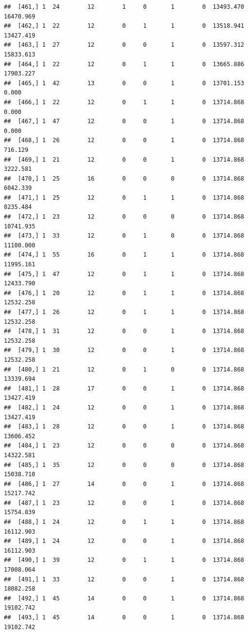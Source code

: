 \documentclass[
]{article}
\begin{document}
\begin{verbatim}
##  [461,] 1  24        12        1     0       1        0  13493.470  16470.969
##  [462,] 1  22        12        0     1       1        0  13518.941  13427.419
##  [463,] 1  27        12        0     0       1        0  13597.312  15833.613
##  [464,] 1  22        12        0     1       1        0  13665.886  17903.227
##  [465,] 1  42        13        0     0       1        0  13701.153      0.000
##  [466,] 1  22        12        0     1       1        0  13714.868      0.000
##  [467,] 1  47        12        0     0       1        0  13714.868      0.000
##  [468,] 1  26        12        0     0       1        0  13714.868    716.129
##  [469,] 1  21        12        0     0       1        0  13714.868   3222.581
##  [470,] 1  25        16        0     0       0        0  13714.868   6042.339
##  [471,] 1  25        12        0     1       1        0  13714.868   8235.484
##  [472,] 1  23        12        0     0       0        0  13714.868  10741.935
##  [473,] 1  33        12        0     1       0        0  13714.868  11100.000
##  [474,] 1  55        16        0     1       1        0  13714.868  11995.161
##  [475,] 1  47        12        0     1       1        0  13714.868  12433.790
##  [476,] 1  20        12        0     1       1        0  13714.868  12532.258
##  [477,] 1  26        12        0     1       1        0  13714.868  12532.258
##  [478,] 1  31        12        0     0       1        0  13714.868  12532.258
##  [479,] 1  30        12        0     0       1        0  13714.868  12532.258
##  [480,] 1  21        12        0     1       0        0  13714.868  13339.694
##  [481,] 1  28        17        0     0       1        0  13714.868  13427.419
##  [482,] 1  24        12        0     0       1        0  13714.868  13427.419
##  [483,] 1  28        12        0     0       1        0  13714.868  13606.452
##  [484,] 1  23        12        0     0       0        0  13714.868  14322.581
##  [485,] 1  35        12        0     0       0        0  13714.868  15038.710
##  [486,] 1  27        14        0     0       1        0  13714.868  15217.742
##  [487,] 1  23        12        0     0       1        0  13714.868  15754.839
##  [488,] 1  24        12        0     1       1        0  13714.868  16112.903
##  [489,] 1  24        12        0     0       1        0  13714.868  16112.903
##  [490,] 1  39        12        0     1       1        0  13714.868  17008.064
##  [491,] 1  33        12        0     0       1        0  13714.868  18082.258
##  [492,] 1  45        14        0     0       1        0  13714.868  19102.742
##  [493,] 1  45        14        0     0       1        0  13714.868  19102.742

\end{verbatim}
\end{document}
